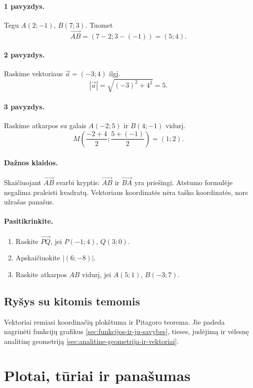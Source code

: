 \paragraph{1 pavyzdys.}
Tegu $A(2;-1)$, $B(7;3)$. Tuomet
\[
\overrightarrow{AB}=(7-2;3-(-1))=(5;4).
\]

\paragraph{2 pavyzdys.}
Raskime vektoriaus $\vec a=(-3;4)$ ilgį.
\[
|\vec a|=\sqrt{(-3)^2+4^2}=5.
\]

\paragraph{3 pavyzdys.}
Raskime atkarpos su galais $A(-2;5)$ ir $B(4;-1)$ vidurį.
\[
M\left(\frac{-2+4}{2};\frac{5+(-1)}{2}\right)=(1;2).
\]

\paragraph{Dažnos klaidos.}
Skaičiuojant $\overrightarrow{AB}$ svarbi kryptis: $\overrightarrow{AB}$ ir $\overrightarrow{BA}$ yra priešingi. Atstumo formulėje negalima praleisti kvadratų. Vektoriaus koordinatės nėra taško koordinatės, nors užrašas panašus.

\paragraph{Pasitikrinkite.}
\begin{enumerate}
\item Raskite $\overrightarrow{PQ}$, jei $P(-1;4)$, $Q(3;0)$.
\item Apskaičiuokite $|(6;-8)|$.
\item Raskite atkarpos $AB$ vidurį, jei $A(5;1)$, $B(-3;7)$.
\end{enumerate}

\subsection{Ryšys su kitomis temomis}

Vektoriai remiasi koordinačių plokštuma ir Pitagoro teorema. Jie padeda nagrinėti funkcijų grafikus \ref{sec:funkcijos-ir-ju-savybes}, tieses, judėjimą ir vėlesnę analitinę geometriją \ref{sec:analitine-geometrija-ir-vektoriai}.

\section{Plotai, tūriai ir panašumas}\label{sec:plotai-turiai-ir-panasumas}

